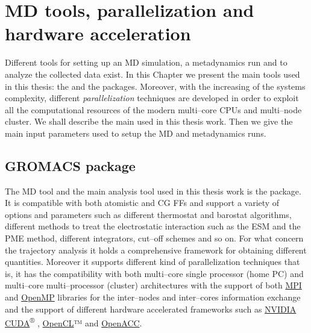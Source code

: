 \chapter{MD tools, parallelization and hardware acceleration}
Different tools for setting up an \ac{MD} simulation, a metadynamics run and to analyze the collected data exist. In this Chapter we present the main tools used in this thesis: the \href{http://www.gromacs.org}{\gromacs} and the \href{http://www.plumed.org}{\plumed} packages. Moreover, with the increasing of the systems complexity, different \textit{parallelization} techniques are developed in order to exploit all the computational resources of the modern multi--core CPUs and multi--node cluster. We shall describe the main used in this thesis work. Then we give the main input parameters used to setup the \ac{MD} and metadynamics runs. 


\section{GROMACS package}
The \ac{MD} tool and the main analysis tool used in this thesis work is the \href{http://www.gromacs.org}{\gromacs} \cite{gromacsManual} package. It is compatible with both atomistic and \ac{CG} \acp{FF} and support a variety of options and parameters such as different thermostat and barostat algorithms, different methods to treat the electrostatic interaction such as the \ac{ESM} and the \ac{PME} method, different integrators, cut--off schemes and so on. For what concern the trajectory analysis it holds a comprehensive framework for obtaining different quantities. Moreover it supports different kind of parallelization techniques that is, it has the compatibility with both multi--core single processor (home PC) and multi--core multi--processor (cluster) architectures with the support of both \href{https://computing.llnl.gov/tutorials/mpi/}{MPI}
and \href{https://computing.llnl.gov/tutorials/openMP/}{OpenMP}
libraries for the inter--nodes and inter--cores information exchange and the support of different hardware accelerated frameworks such as \href{https://developer.nvidia.com/cuda-zone}{NVIDIA CUDA}\textsuperscript{®}
, \href{https://www.khronos.org/opencl/}{OpenCL}™
 and \href{http://www.openacc.org}{OpenACC}.

